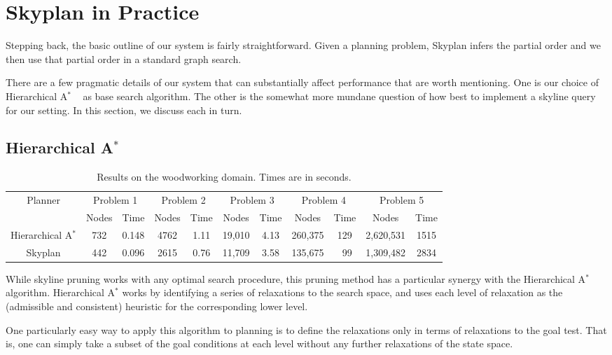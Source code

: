 \documentclass[letterpaper]{article}
\theoremstyle{plain} \newtheorem{theorem}{Theorem} \newtheorem{proposition}{Proposition} \newtheorem{lemma}{Lemma}
\theoremstyle{definition} \newtheorem{definition}{Definition} \newtheorem{conjecture}{Conjecture} \newtheorem*{example}{Example}
\theoremstyle{remark} \newtheorem*{remark}{Remark} \newtheorem*{note}{Note} \newtheorem{case}{Case}
\newcommand{\Astar}{A$^*$ }
\begin{document}
\section{Skyplan in Practice}

Stepping back, the basic outline of our system is fairly straightforward.
Given a planning problem, Skyplan infers the partial order
and we then use that partial order in a standard graph search.

There are a few pragmatic details of our system that can substantially
affect performance that are worth mentioning. One is our choice of
Hierarchical \Astar~\citep{holte1996hierarchical} as base search
algorithm. The
other is the somewhat more mundane question of how best to implement
a skyline query for our setting.  In this section, we discuss each
in turn.

\subsection{Hierarchical \Astar}
\begin{table}
	\begin{center}
		\begin{tabular}{|c|cc|cc|cc|cc|cc|}
		\hline
		\multirow{2}{*}{Planner} & \multicolumn{2}{c|}{Problem 1}  & \multicolumn{2}{c|}{Problem 2} & \multicolumn{2}{c|}{Problem 3} & \multicolumn{2}{c|}{Problem 4} & \multicolumn{2}{c|}{Problem 5} \\
		& Nodes & Time & Nodes & Time & Nodes & Time & Nodes & Time & Nodes & Time \\
		\hline
		Hierarchical \Astar & 732 & 0.148 & 4762 & 1.11 & 19,010 & 4.13 & 260,375 & 129 & 2,620,531 & 1515 \\
		Skyplan         & 442 & 0.096 & 2615 & 0.76 & 11,709 & 3.58 & 135,675 & ~99 & 1,309,482 & 2834 \\
		\hline
		\end{tabular}
	\end{center}
	\caption{Results on the woodworking domain. Times are in seconds.}
	\label{tab:woodworking}
\end{table}
While skyline pruning works with any optimal search procedure, this
pruning method has a particular synergy with the Hierarchical \Astar
algorithm. Hierarchical \Astar works
by identifying a series of relaxations to the search space, and
uses each level of relaxation as the (admissible and consistent)
heuristic for the corresponding lower level.

One particularly easy way to apply this algorithm to planning is
to define the relaxations only in terms of relaxations to the goal
test. That is, one can simply take a subset of the goal conditions
at each level without any further relaxations of the state space. 
\end{document}
